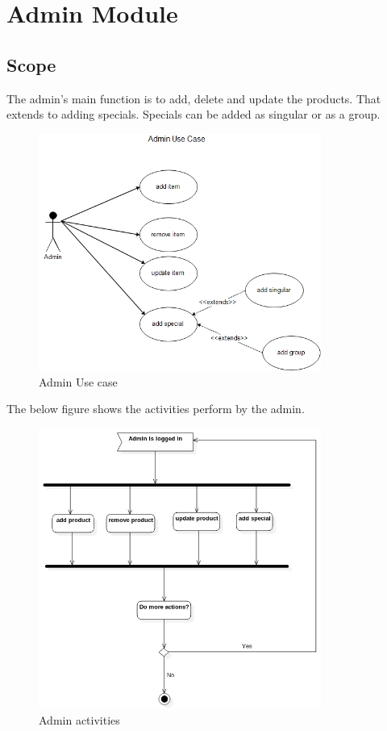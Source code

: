 \documentclass[12pt,a4paper]{article}
\begin{document}
\section{Admin Module}
\subsection{Scope}
The admin's main function is to add, delete and update the products. That extends to adding specials. Specials can be added as singular or as a group.\newpage
\begin{figure}[!ht]
\includegraphics[width=350px]{Diagrams/admin_usecase.jpg}
\caption{Admin Use case}
\end{figure}
The below figure shows the activities perform by the admin.
\begin{figure}[!ht]
\includegraphics[width=350px]{Diagrams/adminActivityDiagram.jpg}
\caption{Admin activities}
\end{figure}\newpage
\end{document}
